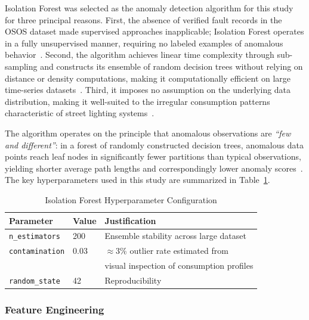 \documentclass{article}
\begin{document}
Isolation Forest was selected as the anomaly detection algorithm for
this study for three principal reasons. First, the absence of verified
fault records in the OSOS dataset made supervised approaches
inapplicable; Isolation Forest operates in a fully unsupervised
manner, requiring no labeled examples of anomalous
behavior~\cite{liu2008isolation}. Second, the algorithm achieves
linear time complexity through sub-sampling and constructs its
ensemble of random decision trees without relying on distance or
density computations, making it computationally efficient on large
time-series datasets~\cite{liu2012isolation}. Third, it imposes no
assumption on the underlying data distribution, making it well-suited
to the irregular consumption patterns characteristic of street
lighting systems~\cite{chandola2009anomaly, ptacek2022road,
nespoli2024street}.

The algorithm operates on the principle that anomalous observations
are \textit{``few and different''}: in a forest of randomly
constructed decision trees, anomalous data points reach leaf nodes in
significantly fewer partitions than typical observations, yielding
shorter average path lengths and correspondingly lower anomaly
scores~\cite{liu2008isolation}. The key hyperparameters used in this
study are summarized in Table~\ref{tab:if_params}.

\begin{table}[h]
\centering
\caption{Isolation Forest Hyperparameter Configuration}
\label{tab:if_params}
\begin{tabular}{lll}
\hline
\textbf{Parameter} & \textbf{Value} & \textbf{Justification} \\
\hline
\texttt{n\_estimators}  & 200  & Ensemble stability across large dataset \\
\texttt{contamination}  & 0.03 & $\approx$3\% outlier rate estimated from \\
                        &      & visual inspection of consumption profiles \\
\texttt{random\_state}  & 42   & Reproducibility \\
\hline
\end{tabular}
\end{table}

\subsubsection{Feature Engineering}
\end{document}
